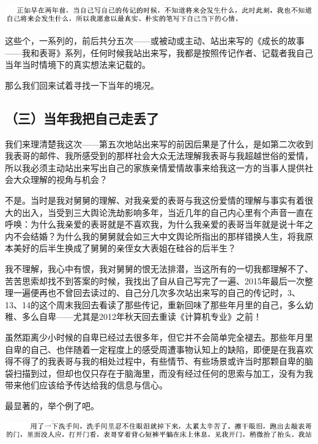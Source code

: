 \documentclass[9pt, b5paper]{article}
\begin{document}
\begin{center}
\includegraphics[width=.9\linewidth]{./pic/backups_plans_20210426_114834.png}
\end{center}

这些个，一系列的，前后共分五次——或被动或主动、站出来写的《成长的故事——我和表哥》系列，任何时候我站出来写，我都是按照传记作者、记载者我自己当年当时情境下的真实想法来记载的。

那么我们回来试着寻找一下当年的境况。

\subsection{（三）当年我把自己走丢了}
\label{sec:org509771b}

我们来理清楚我这次——第五次地站出来写的前因后果是了什么，是如第二次收到我表哥的邮件、我所感受到的那样社会大众无法理解我表哥与我超越世俗的爱情，所以我必须主动站出来写出自己的家族亲情爱情故事来给我这一方的当事人提供社会大众理解的视角与机会？

不是。当时是我对舅舅的理解、对我亲爱的表哥与我这份爱情的理解与事实有着很大的出入，当受到三大舆论洗劫影响多年，当近几年的自己内心里有个声音一直在呼唤：为什么我亲爱的表哥就是不喜欢我，为什么我亲爱的表哥当年就是说十年之内不会结婚？为什么我的舅舅就会如三大中文舆论所指出的那样错换人生，将我原本美好的后半生换成了舅舅的亲侄女大表姐在硅谷的后半生？

我不理解，我心中有恨，我对舅舅的恨无法排潜，当这所有的一切我都理解不了、苦苦思索却找不到答案的时候，我找出了自从自己写完了一遍、2015年最后一次整理一遍便再也不曾回去读过的、自己分几次多次站出来写的自己的传记时，3、13、14的这个周末我回去看读了那些传记，重新回味了那些年月里的自己，多么幼稚、多么自卑——尤其是2012年秋天回去重读《计算机专业》之前！

虽然距离少小时候的自卑已经过去很多年，但它并不会简单完全褪去。那些年月里自卑的自己、也伴随着一定程度上的感受周遭事物认知上的缺陷，即便是在我喜欢得不得了的我表哥与我的相处过程中，有些情节、有些场景或许当时那颗自卑的脑袋扫描到过，但却也仅只存在于脑海里，而没有经过任何的思索与加工，没有为我带来他们应该给予传达给我的信息与信心。

最显著的，举个例了吧。

\begin{center}
\includegraphics[width=.9\linewidth]{./pic/backups_plans_20210426_161140.png}
\end{center}
\end{document}
